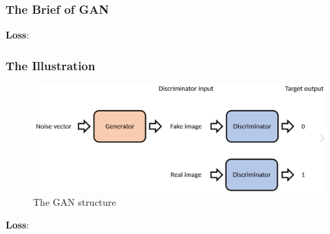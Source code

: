\begin{frame}
    \frametitle{The Brief of GAN\cite{goodfellowGenerativeAdversarialNetworks2014}}
    \begin{quote}
        
    \end{quote}
    \textbf{Loss}:
    
\end{frame}

\begin{frame}
    \frametitle{The Illustration}
    \begin{figure}
        \centering
        \includegraphics[width=\textwidth]{fig_gan_wiki.png}
        \caption{The GAN structure}
    \end{figure}
    \textbf{Loss}:
    
\end{frame}